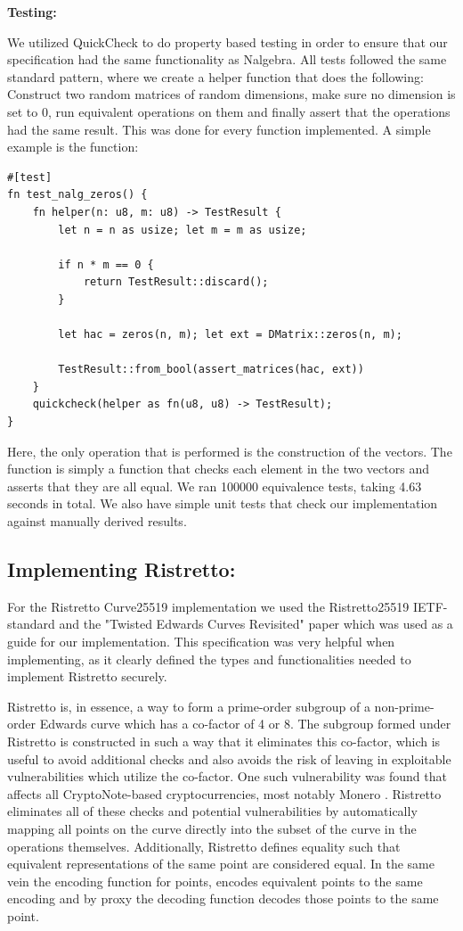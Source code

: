 \documentclass{article}
\newcommand*\ttvar[1]{\texttt{\expandafter\dottvar\detokenize{#1}\relax}}
\newcommand*\dottvar[1]{\ifx\relax#1\else
  \expandafter\ifx\string_#1\string_\allowbreak\else#1\fi
  \expandafter\dottvar\fi}
\begin{document}
\textbf{Testing:}

We utilized QuickCheck to do property based testing in order to ensure
that our specification had the same functionality as Nalgebra. All tests 
followed the same standard pattern, where we create a helper function 
that does the following: Construct two random matrices of random 
dimensions, make sure no dimension is set to 0, run equivalent
operations on them and finally assert that the operations had the same
result. This was done for every function implemented. A simple example 
is the \ttvar{zeros} function:

\begin{lstlisting}
#[test]
fn test_nalg_zeros() {
	fn helper(n: u8, m: u8) -> TestResult {
		let n = n as usize; let m = m as usize;

		if n * m == 0 {
		    return TestResult::discard();
		}

		let hac = zeros(n, m); let ext = DMatrix::zeros(n, m);

		TestResult::from_bool(assert_matrices(hac, ext))
	}
	quickcheck(helper as fn(u8, u8) -> TestResult);
}
\end{lstlisting}

Here, the only operation that is performed is the construction of the
vectors. The \ttvar{assert_matrices} function is simply a function
that checks each element in the two vectors and asserts that they are 
all equal. We ran 100000 equivalence tests, taking 4.63 seconds in
total. We also have simple unit tests that check our implementation
against manually derived results.

\subsection{Implementing Ristretto:} \label{implementing-ristretto}

For the Ristretto Curve25519 implementation we used the Ristretto25519
IETF-standard \cite{ristretto-ietf} and the "Twisted Edwards Curves
Revisited" paper \cite{edwards-curves} which was used as a guide for our
implementation. This specification was very helpful when implementing,
as it clearly defined the types and functionalities needed to implement
Ristretto securely.

Ristretto is, in essence, a way to form a prime-order subgroup of a 
non-prime-order Edwards curve which has a co-factor of 4 or 8. The 
subgroup formed under Ristretto is constructed in such a way that it 
eliminates this co-factor, which is useful to avoid additional checks 
and also avoids the risk of leaving in exploitable vulnerabilities 
which utilize the co-factor. One such vulnerability was found that 
affects all CryptoNote-based cryptocurrencies, most notably Monero 
\cite{cryptonote}. Ristretto eliminates all of these checks and  
potential vulnerabilities by automatically mapping all points on the 
curve directly into the subset of the curve in the operations 
themselves. Additionally, Ristretto defines equality such that equivalent 
representations of the same point are considered equal. In the same 
vein the encoding function for points, encodes equivalent points to the 
same encoding and by proxy the decoding function decodes those points 
to the same point.
\end{document}

